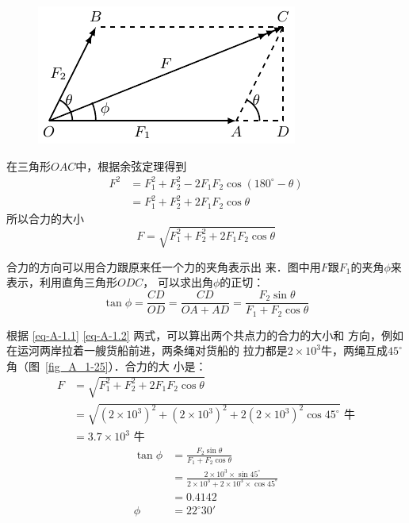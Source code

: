 \begin{figure} [htp]
\centering
\includegraphics{fig/A/1-24.pdf} 
\caption{} \label{fig_A_1-24} 
\end{figure} 


    在三角形$OAC$中，根据余弦定理得到
\[\begin{split} 
F^2 & = F_1^2+F_2^2-2F_1F_2\cos(180^\circ -\theta)  \\
&= F_1^2+F_2^2+2F_1F_2\cos\theta
\end{split}  \]
所以合力的大小
\begin{equation}\label{eq-A-1.1}
F=\sqrt{F_1^2+F_2^2+2F_1F_2\cos\theta} 
\end{equation} 

    合力的方向可以用合力跟原来任一个力的夹角表示出
来．图中用$F$跟$F_1$的夹角$\phi$来表示，利用直角三角形$ODC$，
可以求出角$\phi$的正切：
\begin{equation}\label{eq-A-1.2}
\tan\phi =\frac{CD} {OD} =\frac{CD} {OA+AD} =\frac{F_2\sin\theta } {F_1+F_2\cos\theta} 
\end{equation} 




    根据 \eqref{eq-A-1.1} \eqref{eq-A-1.2} 两式，可以算出两个共点力的合力的大小和
方向，例如在运河两岸拉着一艘货船前进，两条绳对货船的
拉力都是$2\times 10^3$牛，两绳互成$45^\circ$角（图~\ref{fig_A_1-25}）．合力的大
小是：
\[\begin{split} 
F&= \sqrt{F_1^2+F_2^2+2F_1F_2\cos\theta} \\
&=\sqrt{(2\times 10^3)^2+(2\times 10^3)^2+2(2\times 10^3)^2\cos 45^{\circ} } \text{ 牛} \\
&=3.7\times 10^3\text{ 牛} 
\end{split}  \]
\[\begin{split} 
\tan\phi&= \frac{F_2\sin\theta } {F_1+F_2\cos\theta} \\
&= \frac{2\times 10^3\times \sin 45^{\circ} } {2\times 10^3+2\times 10^3\times \cos 45^{\circ} }   \\
&=0.4142\\
\phi &= 22^{\circ}  30'
\end{split}  \]

